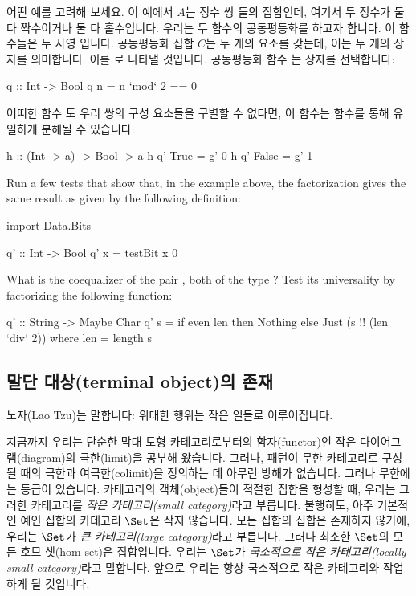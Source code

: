 \documentclass[DaoFP]{subfiles}
\begin{document}
어떤 예를 고려해 보세요. 이 예에서 $A$는 정수 쌍 들의 집합인데, 여기서 두 정수가 둘 다 짝수이거나 둘 다 홀수입니다. 우리는 두 함수의 공동평등화를 하고자 합니다. 이 함수들은 두 사영 입니다. 공동평등화 집합 $C$는 두 개의 요소를 갖는데, 이는 두 개의 상자를 의미합니다. 이를 로 나타낼 것입니다. 공동평등화 함수 는 상자를 선택합니다:
\begin{haskell}
q :: Int -> Bool
q n = n `mod` 2 == 0 
\end{haskell}
어떠한 함수 도 우리 쌍의 구성 요소들을 구별할 수 없다면, 이 함수는  함수를 통해 유일하게 분해될 수 있습니다:
\begin{haskell}
h :: (Int -> a) -> Bool -> a
h q' True  = g' 0
h q' False = g' 1
\end{haskell}

\begin{exercise}
Run a few tests that show that, in the example above, the factorization  gives the same result as  given by the following definition:
\begin{haskell}
import Data.Bits

q' :: Int -> Bool
q' x = testBit x 0
\end{haskell}

\end{exercise}
\begin{exercise}
What is the coequalizer of the pair , both of the type ? Test its universality by factorizing the following function:
\begin{haskell}
q' :: String -> Maybe Char
q' s = if even len
       then Nothing
       else Just (s !! (len `div` 2))
  where len = length s
\end{haskell}
\end{exercise}

\subsection{말단 대상(terminal object)의 존재}



노자(Lao Tzu)는 말합니다: 위대한 행위는 작은 일들로 이루어집니다.

지금까지 우리는 단순한 막대 도형 카테고리로부터의 함자(functor)인 작은 다이어그램(diagram)의 극한(limit)을 공부해 왔습니다. 그러나, 패턴이 무한 카테고리로 구성될 때의 극한과 여극한(colimit)을 정의하는 데 아무런 방해가 없습니다. 그러나 무한에는 등급이 있습니다. 카테고리의 객체(object)들이 적절한 집합을 형성할 때, 우리는 그러한 카테고리를 \emph{작은 카테고리(small category)}라고 부릅니다. 불행히도, 아주 기본적인 예인 집합의 카테고리 $\Set$은 작지 않습니다. 모든 집합의 집합은 존재하지 않기에, 우리는 $\Set$가 \emph{큰 카테고리(large category)}라고 부릅니다. 그러나 최소한 $\Set$의 모든 호므-셋(hom-set)은 집합입니다. 우리는 $\Set$가 \emph{국소적으로 작은 카테고리(locally small category)}라고 말합니다. 앞으로 우리는 항상 국소적으로 작은 카테고리와 작업하게 될 것입니다.
\end{document}
